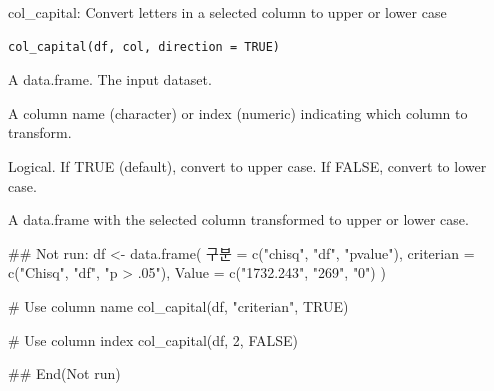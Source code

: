 \documentclass[a4paper]{book}
\begin{document}
%
\begin{Description}
col\_capital: Convert letters in a selected column to upper or lower case
\end{Description}
%
\begin{Usage}
\begin{verbatim}
col_capital(df, col, direction = TRUE)
\end{verbatim}
\end{Usage}
%
\begin{Arguments}
\begin{ldescription}
\item[\code{df}] A data.frame. The input dataset.

\item[\code{col}] A column name (character) or index (numeric) indicating which column to transform.

\item[\code{direction}] Logical. If TRUE (default), convert to upper case. If FALSE, convert to lower case.
\end{ldescription}
\end{Arguments}
%
\begin{Value}
A data.frame with the selected column transformed to upper or lower case.
\end{Value}
%
\begin{Examples}
\begin{ExampleCode}
\#\# Not run: 
df <- data.frame(
  구분 = c("chisq", "df", "pvalue"),
  criterian = c("Chisq", "df", "p > .05"),
  Value = c("1732.243", "269", "0")
)

# Use column name
col_capital(df, "criterian", TRUE)

# Use column index
col_capital(df, 2, FALSE)

## End(Not run)
\end{ExampleCode}
\end{Examples}
\end{document}
